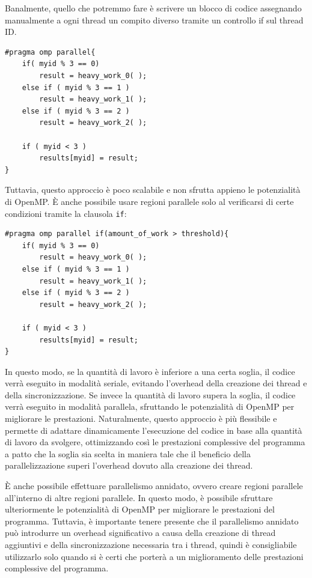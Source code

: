 Banalmente, quello che potremmo fare è scrivere un blocco di codice assegnando manualmente a ogni thread un compito diverso tramite un controllo if sul thread ID. 
\begin{verbatim}
#pragma omp parallel{
    if( myid % 3 == 0)
        result = heavy_work_0( );
    else if ( myid % 3 == 1 )
        result = heavy_work_1( );
    else if ( myid % 3 == 2 )
        result = heavy_work_2( );

    if ( myid < 3 )
        results[myid] = result;
}
\end{verbatim}
Tuttavia, questo approccio è poco scalabile e non sfrutta appieno le potenzialità di OpenMP. È anche possibile usare regioni parallele solo al verificarsi di certe condizioni tramite la clausola \texttt{if}: 
\begin{verbatim}
#pragma omp parallel if(amount_of_work > threshold){
    if( myid % 3 == 0)
        result = heavy_work_0( );
    else if ( myid % 3 == 1 )
        result = heavy_work_1( );
    else if ( myid % 3 == 2 )
        result = heavy_work_2( );

    if ( myid < 3 )
        results[myid] = result;
}
\end{verbatim}
In questo modo, se la quantità di lavoro è inferiore a una certa soglia, il codice verrà eseguito in modalità seriale, evitando l'overhead della creazione dei thread e della sincronizzazione. Se invece la quantità di lavoro supera la soglia, il codice verrà eseguito in modalità parallela, sfruttando le potenzialità di OpenMP per migliorare le prestazioni. 
Naturalmente, questo approccio è più flessibile e permette di adattare dinamicamente l'esecuzione del codice in base alla quantità di lavoro da svolgere, ottimizzando così le prestazioni complessive del programma a patto che la soglia sia scelta in maniera tale che il beneficio della parallelizzazione superi l'overhead dovuto alla creazione dei thread.

È anche possibile effettuare parallelismo annidato, ovvero creare regioni parallele all'interno di altre regioni parallele. In questo modo, è possibile sfruttare ulteriormente le potenzialità di OpenMP per migliorare le prestazioni del programma. Tuttavia, è importante tenere presente che il parallelismo annidato può introdurre un overhead significativo a causa della creazione di thread aggiuntivi e della sincronizzazione necessaria tra i thread, quindi è consigliabile utilizzarlo solo quando si è certi che porterà a un miglioramento delle prestazioni complessive del programma. 

